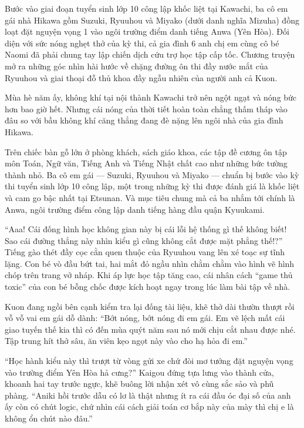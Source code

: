 \documentclass[../main.tex]{subfiles}
\begin{document}
 Bước vào giai đoạn tuyển sinh lớp 10 công lập khốc liệt tại Kawachi, ba cô em gái nhà Hikawa gồm Suzuki, Ryuuhou và Miyako (dưới danh nghĩa Mizuha) đồng loạt đặt nguyện vọng 1 vào ngôi trường điểm danh tiếng Anwa (Yên Hòa). Đối diện với sức nóng nghẹt thở của kỳ thi, cả gia đình 6 anh chị em cùng cô bé Naomi đã phải chung tay lập chiến dịch cứu trợ học tập cấp tốc. Chương truyện mở ra những góc nhìn hài hước về chặng đường ôn thi đầy nước mắt của Ryuuhou và giai thoại đỗ thủ khoa đầy ngẫu nhiên của người anh cả Kuon.

Mùa hè năm ấy, không khí tại nội thành Kawachi trở nên ngột ngạt và nóng bức hơn bao giờ hết. Nhưng cái nóng của thời tiết hoàn toàn chẳng thấm tháp vào đâu so với bầu không khí căng thẳng đang đè nặng lên ngôi nhà của gia đình Hikawa.

Trên chiếc bàn gỗ lớn ở phòng khách, sách giáo khoa, các tập đề cương ôn tập môn Toán, Ngữ văn, Tiếng Anh và Tiếng Nhật chất cao như những bức tường thành nhỏ. Ba cô em gái — Suzuki, Ryuuhou và Miyako — chuẩn bị bước vào kỳ thi tuyển sinh lớp 10 công lập, một trong những kỳ thi được đánh giá là khốc liệt và cam go bậc nhất tại Etsunan. Và mục tiêu chung mà cả ba nhắm tới chính là Anwa, ngôi trường điểm công lập danh tiếng hàng đầu quận Kyuukami.

``Aaa! Cái đống hình học không gian này bị cái lỗi hệ thống gì thế không biết! Sao cái đường thẳng này nhìn kiểu gì cũng không cắt được mặt phẳng thế!?'' Tiếng gào thét đầy cọc cằn quen thuộc của Ryuuhou vang lên xé toạc sự tĩnh lặng. Con bé vò đầu bứt tai, hai mắt đỏ ngầu nhìn chằm chằm vào hình vẽ hình chóp trên trang vở nháp. Khi áp lực học tập tăng cao, cái nhân cách ``game thủ toxic'' của con bé bỗng chốc được kích hoạt ngay trong lúc làm bài tập về nhà.

Kuon đang ngồi bên cạnh kiểm tra lại đống tài liệu, khẽ thở dài thườn thượt rồi vỗ vỗ vai em gái dỗ dành: ``Bớt nóng, bớt nóng đi em gái. Em vẽ lệch mất cái giao tuyến thế kia thì có đến mùa quýt năm sau nó mới chịu cắt nhau được nhé. Tập trung hít thở sâu, ăn viên kẹo ngọt này vào cho hạ hỏa đi em.''

``Học hành kiểu này thì trượt từ vòng gửi xe chứ đòi mơ tưởng đặt nguyện vọng vào trường điểm Yên Hòa hả cưng?'' Kaigou đứng tựa lưng vào thành cửa, khoanh hai tay trước ngực, khẽ buông lời nhận xét vô cùng sắc sảo và phũ phàng. ``Aniki hồi trước dẫu có lơ là thật nhưng ít ra cái đầu óc đại số của anh ấy còn có chút logic, chứ nhìn cái cách giải toán cơ bắp này của mày thì chị e là không ổn chút nào đâu.''
\end{document}
